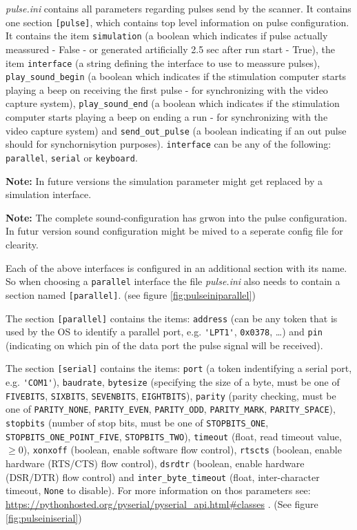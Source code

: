 \documentclass[12pt,a4paper]{book}
\begin{document}
\textit{pulse.ini} contains all parameters regarding pulses send by the scanner. It contains one section \verb|[pulse]|, which contains top level information on pulse configuration. It contains the item \verb|simulation| (a boolean which indicates if pulse actually meassured - False - or generated artificially 2.5 sec after run start - True), the item \verb|interface| (a string defining the interface to use to meassure pulses), \verb|play_sound_begin| (a boolean which indicates if the stimulation computer starts playing a beep on receiving the first pulse - for synchronizing with the video capture system), \verb|play_sound_end| (a boolean which indicates if the stimulation computer starts playing a beep on ending a run - for synchronizing with the video capture system) and \verb|send_out_pulse| (a boolean indicating if an out pulse should for synchornisytion purposes). \verb|interface| can be any of the following: \verb|parallel|, \verb|serial| or \verb|keyboard|.

\textbf{Note:} In future versions the simulation parameter might get replaced by a simulation interface.

\textbf{Note:} The complete sound-configuration has grwon into the pulse configuration. In futur version sound configuration might be mived to a seperate config file for clearity.

Each of the above interfaces is configured in an additional section with its name. So when choosing a \verb|parallel| interface the file \textit{pulse.ini} also needs to contain a section named \verb|[parallel]|. (see figure \ref{fig:pulseiniparallel})

The section \verb|[parallel]| contains the items: \verb|address| (can be any token that is used by the OS to identify a parallel port, e.g. \verb|'LPT1'|, \verb|0x0378|, \dots) and \verb|pin| (indicating on which pin of the data port the pulse signal will be received).

The section \verb|[serial]| contains the items: \verb|port| (a token indentifying a serial port, e.g. \verb|'COM1'|), \verb|baudrate|, \verb|bytesize| (specifying the size of a byte, must be one of \verb|FIVEBITS|, \verb|SIXBITS|, \verb|SEVENBITS|, \verb|EIGHTBITS|), \verb|parity| (parity checking, must be one of \verb|PARITY_NONE|, \verb|PARITY_EVEN|, \verb|PARITY_ODD|, \verb|PARITY_MARK|, \verb|PARITY_SPACE|), \verb|stopbits| (number of stop bits, must be one of \verb|STOPBITS_ONE|, \verb|STOPBITS_ONE_POINT_FIVE|, \verb|STOPBITS_TWO|), \verb|timeout| (float, read timeout value, $\ge 0$), \verb|xonxoff| (boolean, enable software flow control), \verb|rtscts| (boolean, enable hardware (RTS/CTS) flow control), \verb|dsrdtr| (boolean, enable hardware (DSR/DTR) flow control) and \verb|inter_byte_timeout| (float, inter-character timeout, \verb|None| to disable). For more information on thos parameters see: \url{https://pythonhosted.org/pyserial/pyserial_api.html#classes} . (See figure \ref{fig:pulseiniserial})
\end{document}
